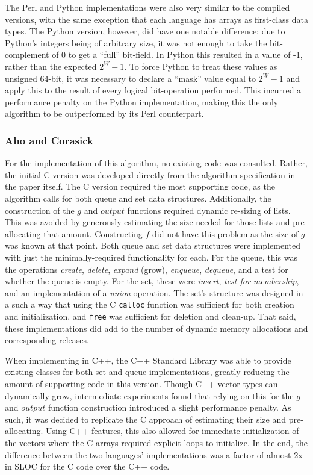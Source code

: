 The Perl and Python implementations were also very similar to the compiled versions, with the same exception that each language has arrays as first-class data types. The Python version, however, did have one notable difference: due to Python's integers being of arbitrary size, it was not enough to take the bit-complement of 0 to get a ``full'' bit-field. In Python this resulted in a value of -1, rather than the expected $2^W - 1$. To force Python to treat these values as unsigned 64-bit, it was necessary to declare a ``mask'' value equal to $2^W - 1$ and apply this to the result of every logical bit-operation performed. This incurred a performance penalty on the Python implementation, making this the only algorithm to be outperformed by its Perl counterpart.

\subsubsection{Aho and Corasick}

For the implementation of this algorithm, no existing code was consulted. Rather, the initial C version was developed directly from the algorithm specification in the paper itself. The C version required the most supporting code, as the algorithm calls for both queue and set data structures. Additionally, the construction of the $g$ and $output$ functions required dynamic re-sizing of lists. This was avoided by generously estimating the size needed for those lists and pre-allocating that amount. Constructing $f$ did not have this problem as the size of $g$ was known at that point. Both queue and set data structures were implemented with just the minimally-required functionality for each. For the queue, this was the operations \textit{create}, \textit{delete}, \textit{expand} (grow), \textit{enqueue}, \textit{dequeue}, and a test for whether the queue is empty. For the set, these were \textit{insert}, \textit{test-for-membership}, and an implementation of a \textit{union} operation. The set's structure was designed in a such a way that using the C \texttt{calloc} function was sufficient for both creation and initialization, and \texttt{free} was sufficient for deletion and clean-up. That said, these implementations did add to the number of dynamic memory allocations and corresponding releases.

When implementing in C++, the C++ Standard Library was able to provide existing classes for both set and queue implementations, greatly reducing the amount of supporting code in this version. Though C++ vector types can dynamically grow, intermediate experiments found that relying on this for the $g$ and $output$ function construction introduced a slight performance penalty. As such, it was decided to replicate the C approach of estimating their size and pre-allocating. Using C++ features, this also allowed for immediate initialization of the vectors where the C arrays required explicit loops to initialize. In the end, the difference between the two languages' implementations was a factor of almost 2x in SLOC for the C code over the C++ code.

